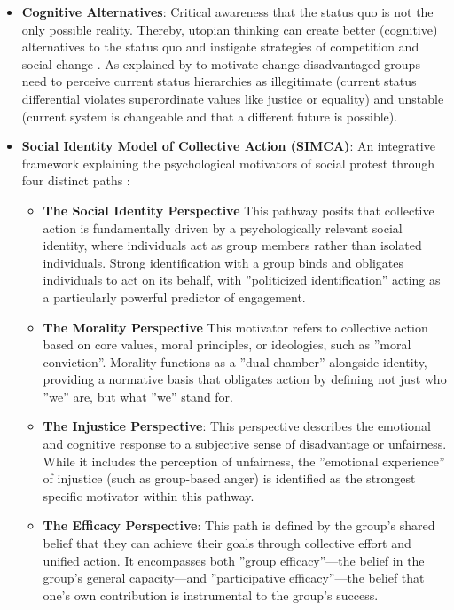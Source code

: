 \documentclass[jou,floatsintext]{apa7}
\begin{document}
\begin{itemize}
\begin{itemize}
\item \textbf{Cognitive Alternatives}: Critical awareness that the status quo is not the only possible reality. Thereby, utopian thinking can create better (cognitive) alternatives to the status quo and instigate strategies of competition and social
change \parencite[see Fig. 1 in][]{kashimaUtopiaIdeologyCultural2020}. As explained by \cite{panayiotouImpossibleWorldsSocial2020} to motivate change disadvantaged groups need to perceive current status hierarchies as illegitimate (current status differential violates superordinate values like justice or equality) and unstable (current system is changeable and that a different future is possible). 

\item \textbf{Social Identity Model of Collective Action (SIMCA)}: An integrative framework explaining the psychological motivators of social protest through four distinct paths \parencite{agostiniComprehensivePotentiallyCrosscultural2021}:
\begin{itemize}
    \item \textbf{The Social Identity Perspective} This pathway posits that collective action is fundamentally driven by a psychologically relevant social identity, where individuals act as group members rather than isolated individuals. Strong identification with a group binds and obligates individuals to act on its behalf, with ''politicized identification'' acting as a particularly powerful predictor of engagement.
    \item \textbf{The Morality Perspective} This motivator refers to collective action based on core values, moral principles, or ideologies, such as ''moral conviction''. Morality functions as a ''dual chamber'' alongside identity, providing a normative basis that obligates action by defining not just who ''we'' are, but what ''we'' stand for.
    \item \textbf{The Injustice Perspective}: This perspective describes the emotional and cognitive response to a subjective sense of disadvantage or unfairness. While it includes the perception of unfairness, the ''emotional experience'' of injustice (such as group-based anger) is identified as the strongest specific motivator within this pathway.
    \item \textbf{The Efficacy Perspective}: This path is defined by the group’s shared belief that they can achieve their goals through collective effort and unified action. It encompasses both ''group efficacy''---the belief in the group's general capacity—and ''participative efficacy''---the belief that one's own contribution is instrumental to the group’s success.

\end{itemize}
\end{itemize}
\end{itemize}
\end{document}
